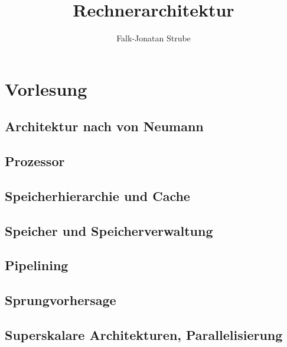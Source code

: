 \documentclass{scrreprt}
\title{Rechnerarchitektur}
\author{Falk-Jonatan Strube}
\begin{document}
\maketitle
\tableofcontents


\part{Vorlesung}

\chapter{Architektur nach von Neumann}


\chapter{Prozessor}


\chapter{Speicherhierarchie und Cache}


\chapter{Speicher und Speicherverwaltung}


\chapter{Pipelining}


\chapter{Sprungvorhersage}


\chapter{Superskalare Architekturen, Parallelisierung}

\end{document}
